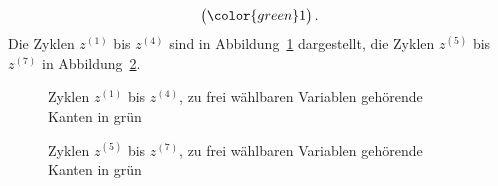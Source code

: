 \begin{loesung}
\[\begin{pmatrix}
\color{green} 1
\end{pmatrix}.
\]
Die Zyklen $z^{(1)}$ bis $z^{(4)}$ sind in Abbildung~\ref{10000028:z1bisz4}
dargestellt, die Zyklen $z^{(5)}$ bis $z^{(7)}$ in Abbildung~\ref{10000028:z5bisz7}.
\begin{figure}
\centering
{}
\caption{Zyklen $z^{(1)}$ bis $z^{(4)}$, zu frei wählbaren Variablen
gehörende Kanten in grün
\label{10000028:z1bisz4}}
\end{figure}
\begin{figure}
\centering
{}
\caption{Zyklen $z^{(5)}$ bis $z^{(7)}$, zu frei wählbaren Variablen
gehörende Kanten in grün
\label{10000028:z5bisz7}}
\end{figure}

\end{loesung}
